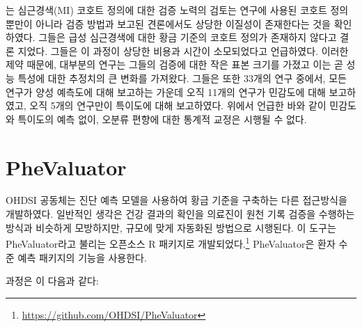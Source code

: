 \documentclass[11pt]{book}
\let\rmarkdownfootnote\footnote%
\def\footnote{\protect\rmarkdownfootnote}
\theoremstyle{definition}
\theoremstyle{definition}
\theoremstyle{definition}
\theoremstyle{remark}
\begin{document}
\citet{Rubbo2015phenotypes} 는 심근경색(MI) 코호트 정의에 대한 검증
노력의 검토는 연구에 사용된 코호트 정의뿐만이 아니라 검증 방법과 보고된
견론에서도 상당한 이질성이 존재한다는 것을 확인하였다. 그들은 급성
심근경색에 대한 황금 기준의 코호트 정의가 존재하지 않다고 결론 지었다.
그들은 이 과정이 상당한 비용과 시간이 소모되었다고 언급하였다. 이러한
제약 때문에, 대부분의 연구는 그들의 검증에 대한 작은 표본 크기를 가졌고
이는 곧 성능 특성에 대한 추정치의 큰 변화를 가져왔다. 그들은 또한 33개의
연구 중에서, 모든 연구가 양성 예측도에 대해 보고하는 가운데 오직 11개의
연구가 민감도에 대해 보고하였고, 오직 5개의 연구만이 특이도에 대해
보고하였다. 위에서 언급한 바와 같이 민감도와 특이도의 예측 없이, 오분류
편향에 대한 통계적 교정은 시행될 수 없다.

\section{PheValuator}\label{phevaluator}


OHDSI 공동체는 진단 예측 모델을 사용하여 황금 기준을 구축하는 다른
접근방식을 개발하였다. \citep{Swerdel2019phevaluator} 일반적인 생각은
건강 결과의 확인을 의료진이 원천 기록 검증을 수행하는 방식과 비슷하게
모방하지만, 규모에 맞게 자동화된 방법으로 시행된다. 이 도구는
PheValuator라고 불리는 오픈소스 R 패키지로 개발되었다.\footnote{\url{https://github.com/OHDSI/PheValuator}}
PheValuator은 환자 수준 예측 패키지의 기능을 사용한다.

과정은 이 다음과 같다:
\end{document}
